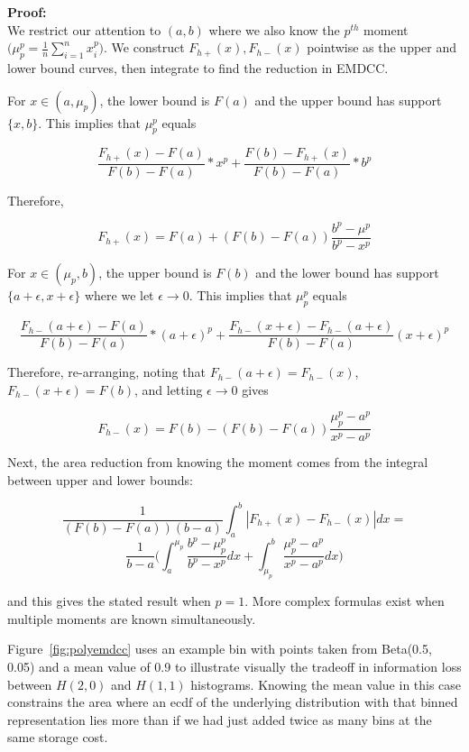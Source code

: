 \documentclass{article}
\begin{document}
\noindent
\textbf{Proof:} \\

We restrict our attention to $(a,b)$ where we also know the $p^{th}$ moment$\big(\mu_p^p = \frac{1}{n} \sum_{i=1}^n x_i^p \big)$.  We construct $F_{h+}(x), F_{h-}(x)$ pointwise as the upper and lower bound curves, then integrate to find the reduction in EMDCC. %

For $x \in (a, \mu_p)$, the lower bound is $F(a)$ and the upper bound has support $\{x, b\}$.  This implies that $\mu_p^p$ equals

$$
\frac{F_{h+}(x)-F(a)}{F(b)-F(a)} * x^p + \frac{F(b)-F_{h+}(x)}{F(b)-F(a)} * b^p
$$

Therefore,

$$
F_{h+}(x) = F(a) + (F(b)-F(a)) \frac{b^p-\mu^p}{b^p-x^p}
$$

For $x \in (\mu_p, b)$, the upper bound is $F(b)$ and the lower bound has support $\{a+\epsilon, x+\epsilon\}$ where we let $\epsilon \rightarrow 0$.  This implies that $\mu_p^p$ equals

$$
\frac{F_{h-}(a+\epsilon)-F(a)}{F(b)-F(a)} * (a+\epsilon)^p + \frac{F_{h-}(x+\epsilon)-F_{h-}(a + \epsilon)}{F(b)-F(a)} (x + \epsilon)^p
$$

Therefore, re-arranging, noting that $F_{h-}(a+\epsilon)=F_{h-}(x)$, $F_{h-}(x+\epsilon)=F(b)$, and letting $\epsilon \rightarrow 0$ gives

$$
F_{h-}(x) = F(b) - (F(b)-F(a)) \frac{\mu_p^p - a^p}{x^p-a^p}
$$

Next, the area reduction from knowing the moment comes from the integral between upper and lower bounds:

$$
\frac{1}{(F(b)-F(a))(b-a)}\int_{a}^{b} |F_{h+}(x) - F_{h-}(x)|dx =
$$
$$
\frac{1}{b-a} \bigg(
\int_{a}^{\mu_p} \frac{b^p-\mu_p^p}{b^p-x^p}dx + \int_{\mu_p}^{b} \frac{\mu_p^p-a^p}{x^p-a^p}dx
\bigg)
$$

\noindent
and this gives the stated result when $p=1$.  More complex formulas exist when multiple moments are known simultaneously.

Figure~\ref{fig:polyemdcc} uses an example bin with points taken from
Beta(0.5, 0.05) and a mean value of 0.9 to illustrate visually the
tradeoff in information loss between $H(2,0)$ and $H(1,1)$ histograms.
Knowing the mean value in this case
constrains the area where an ecdf of the underlying distribution with
that binned representation lies more than if we had just added twice
as many bins at the same storage cost.
\end{document}
